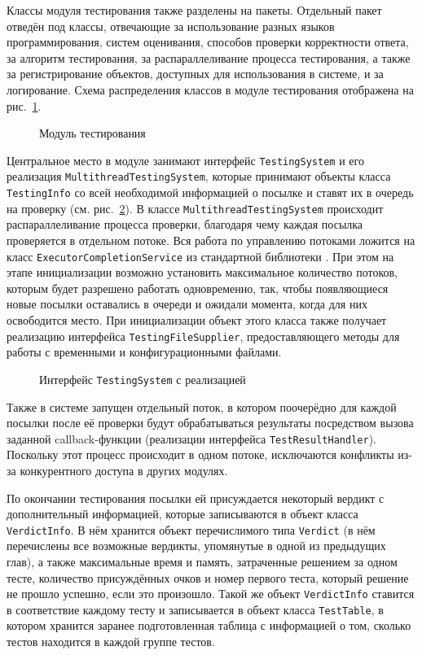 Классы модуля тестирования также разделены на пакеты. Отдельный пакет отведён под классы, отвечающие за использование разных языков программирования, систем оценивания, способов проверки корректности ответа, за алгоритм тестирования, за распараллеливание процесса тестирования, а также за регистрирование объектов, доступных для использования в системе, и за логирование. Схема распределения классов в модуле тестирования отображена на рис.~\ref{package_diagram_testing}.

\begin{figure}[h]
\caption{Модуль тестирования}
\label{package_diagram_testing}
\end{figure}

Центральное место в модуле занимают интерфейс \texttt{Testing\-System} и его реализация \texttt{Multithread\-Testing\-System}, которые принимают объекты класса \texttt{Tes\-ting\-Info} со всей необходимой информацией о посылке и ставят их в очередь на проверку (см. рис.~\ref{class_diagram_multithread}). В классе \texttt{Multithread\-Testing\-System} происходит распараллеливание процесса проверки, благодаря чему каждая посылка проверяется в отдельном потоке. Вся работа по управлению потоками ложится на класс \texttt{Executor\-Completion\-Service} из стандартной библиотеки%
. При этом на этапе инициализации возможно установить максимальное количество потоков, которым будет разрешено работать одновременно, так, чтобы появляющиеся новые посылки оставались в очереди и ожидали момента, когда для них освободится место. При инициализации объект этого класса также получает реализацию интерфейса \texttt{Testing\-File\-Supplier}, предоставляющего методы для работы с временными и конфигурационными файлами.

\begin{figure}[h]
\caption{Интерфейс \texttt{TestingSystem} с реализацией}
\label{class_diagram_multithread}
\end{figure}

Также в системе запущен отдельный поток, в котором поочерёдно для каждой посылки после её проверки будут обрабатываться результаты посредством вызова заданной callback-функции (реализации интерфейса \texttt{Test\-Result\-Handler}). Поскольку этот процесс происходит в одном потоке, исключаются конфликты из-за конкурентного доступа в других модулях.

По окончании тестирования посылки ей присуждается некоторый вердикт с дополнительный информацией, которые записываются в объект класса \texttt{Verdict\-Info}. В нём хранится объект перечислимого типа \texttt{Verdict} (в нём перечислены все возможные вердикты, упомянутые в одной из предыдущих глав), а также максимальные время и память, затраченные решением за одном тесте, количество присуждённых очков и номер первого теста, который решение не прошло успешно, если это произошло. Такой же объект \texttt{Verdict\-Info} ставится в соответствие каждому тесту и записывается в объект класса \texttt{Test\-Table}, в котором хранится заранее подготовленная таблица с информацией о том, сколько тестов находится в каждой группе тестов.

